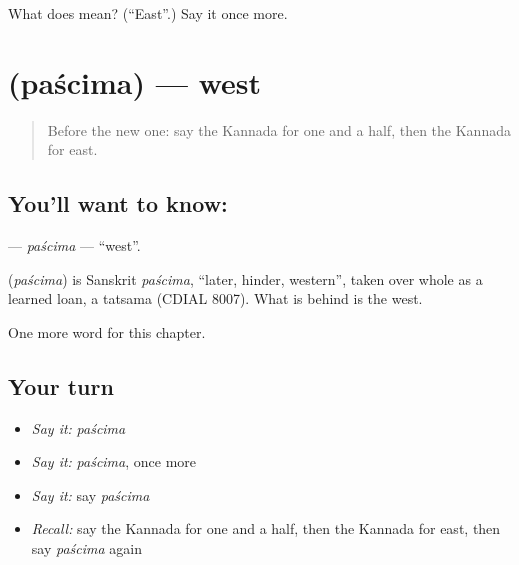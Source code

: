 \begin{tcolorbox}[breakable,colback=teal!4,colframe=teal!35!black,title={Before you move on}]
What does  mean? (\textquotedblleft{}East\textquotedblright{}.) Say it once more.
\end{tcolorbox}
\section[\texorpdfstring{\kn{ಪಶ್ಚಿಮ} (paścima)}{ಪಶ್ಚಿಮ (paścima)}]{ (paścima) — west}

\label{lesson:KA-C249-pascima}



\begin{quote}
Before the new one: say the Kannada for one and a half, then the Kannada for east.
\end{quote}

\subsection*{You'll want to know: }
\textbf{} — \emph{paścima} — \textquotedblleft{}west\textquotedblright{}.

\begin{cousinweb}
\textbf{} (\emph{paścima}) is Sanskrit \emph{paścima}, \textquotedblleft{}later, hinder, western\textquotedblright{}, taken over whole as a learned loan, a tatsama (CDIAL 8007). What is behind is the west.
\end{cousinweb}

\begin{grammarlens}[title={What you've built}]
One more word for this chapter.
\end{grammarlens}

\subsection*{Your turn}
\begin{itemize}
\raggedright
  \item \emph{Say it:} \emph{paścima}
  \item \emph{Say it:} \emph{paścima}, once more
  \item \emph{Say it:} say \emph{paścima}
  \item \emph{Recall:} say the Kannada for one and a half, then the Kannada for east, then say \emph{paścima} again
\end{itemize}

